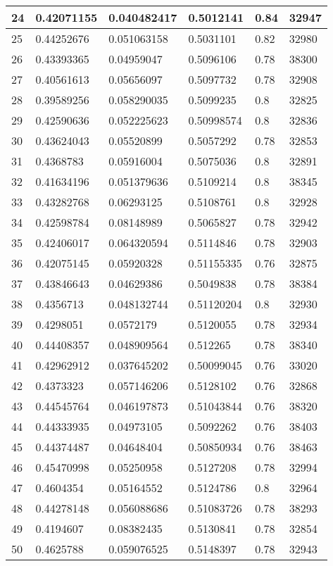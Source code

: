 \begin{longtable}{|l|l|l|l|l|l|}
24 & 0.42071155 & 0.040482417 & 0.5012141 & 0.84 & 32947 \\ \hline 
25 & 0.44252676 & 0.051063158 & 0.5031101 & 0.82 & 32980 \\ \hline 
26 & 0.43393365 & 0.04959047 & 0.5096106 & 0.78 & 38300 \\ \hline 
27 & 0.40561613 & 0.05656097 & 0.5097732 & 0.78 & 32908 \\ \hline 
28 & 0.39589256 & 0.058290035 & 0.5099235 & 0.8 & 32825 \\ \hline 
29 & 0.42590636 & 0.052225623 & 0.50998574 & 0.8 & 32836 \\ \hline 
30 & 0.43624043 & 0.05520899 & 0.5057292 & 0.78 & 32853 \\ \hline 
31 & 0.4368783 & 0.05916004 & 0.5075036 & 0.8 & 32891 \\ \hline 
32 & 0.41634196 & 0.051379636 & 0.5109214 & 0.8 & 38345 \\ \hline 
33 & 0.43282768 & 0.06293125 & 0.5108761 & 0.8 & 32928 \\ \hline 
34 & 0.42598784 & 0.08148989 & 0.5065827 & 0.78 & 32942 \\ \hline 
35 & 0.42406017 & 0.064320594 & 0.5114846 & 0.78 & 32903 \\ \hline 
36 & 0.42075145 & 0.05920328 & 0.51155335 & 0.76 & 32875 \\ \hline 
37 & 0.43846643 & 0.04629386 & 0.5049838 & 0.78 & 38384 \\ \hline 
38 & 0.4356713 & 0.048132744 & 0.51120204 & 0.8 & 32930 \\ \hline 
39 & 0.4298051 & 0.0572179 & 0.5120055 & 0.78 & 32934 \\ \hline 
40 & 0.44408357 & 0.048909564 & 0.512265 & 0.78 & 38340 \\ \hline 
41 & 0.42962912 & 0.037645202 & 0.50099045 & 0.76 & 33020 \\ \hline 
42 & 0.4373323 & 0.057146206 & 0.5128102 & 0.76 & 32868 \\ \hline 
43 & 0.44545764 & 0.046197873 & 0.51043844 & 0.76 & 38320 \\ \hline 
44 & 0.44333935 & 0.04973105 & 0.5092262 & 0.76 & 38403 \\ \hline 
45 & 0.44374487 & 0.04648404 & 0.50850934 & 0.76 & 38463 \\ \hline 
46 & 0.45470998 & 0.05250958 & 0.5127208 & 0.78 & 32994 \\ \hline 
47 & 0.4604354 & 0.05164552 & 0.5124786 & 0.8 & 32964 \\ \hline 
48 & 0.44278148 & 0.056088686 & 0.51083726 & 0.78 & 38293 \\ \hline 
49 & 0.4194607 & 0.08382435 & 0.5130841 & 0.78 & 32854 \\ \hline 
50 & 0.4625788 & 0.059076525 & 0.5148397 & 0.78 & 32943 \\ \hline 
\end{longtable}